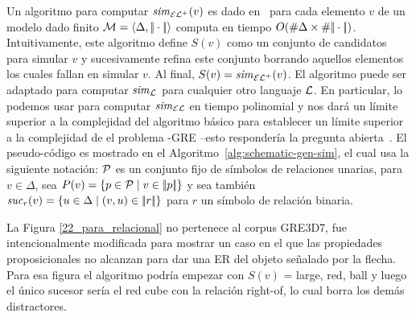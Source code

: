 %



Un algoritmo para computar ${\it sim}_{{\mathcal{EL}^+}}(v)$ es dado en~\cite{HHK95} para cada
elemento $v$ de un modelo dado finito
$\mathcal{M}=\langle \Delta,|\!|\cdot|\!| \rangle$
computa en tiempo $O(\# \Delta\times\# {|\!|\cdot|\!|})$.
Intuitivamente, este algoritmo
define $S(v)$ como un conjunto de candidatos para simular $v$ y
sucesivamente refina este conjunto borrando aquellos elementos los cuales fallan en simular $v$.
Al final, $S(v)={\it sim}_{\mathcal{EL}^+}(v)$. El algoritmo puede ser adaptado para
computar ${\it sim}_{\mathcal{L}}$ para cualquier otro languaje $\mathcal{L}$. En particular,
lo podemos usar para computar ${\it sim}_\mathcal{EL}$ en tiempo polinomial y nos dar\'a un l\'imite superior a la
complejidad del algoritmo b\'asico para establecer un l\'imite superior a la complejidad de el problema \EL-GRE 
--esto responder\'ia la pregunta abierta~\cite{areces08}. El pseudo-c\'odigo es mostrado en el
Algoritmo~\ref{alg:schematic-gen-sim}, el cual usa la siguiente
notaci\'on: $\mathcal{P}$ es un conjunto fijo de s\'imbolos de relaciones unarias, para $v\in
\Delta$, sea $P(v)=\{p\in\mathcal{P}\mid v\in|\!|p|\!|\}$ y sea tambi\'en
${\it suc}_{r}(v)=\{u\in\Delta\mid(v,u)\in|\!|r|\!|\}$ para $r$ un s\'imbolo de relaci\'on binaria.

La Figura \ref{22_para_relacional} no pertenece al corpus GRE3D7, fue intencionalmente modificada para mostrar un caso en el que las propiedades proposicionales no alcanzan para dar una ER del objeto se\~nalado por la flecha. Para esa figura el algoritmo podr\'ia empezar con $S(v)$ = large, red, ball y luego el \'unico sucesor ser\'ia el red cube con la relaci\'on right-of, lo cual borra los dem\'as distractores.


